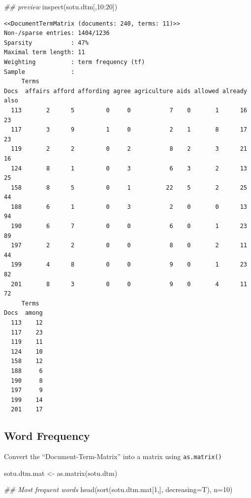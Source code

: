 \documentclass[
  letterpaper,
  DIV=11,
  numbers=noendperiod]{scrreprt}
\newenvironment{Shaded}{\begin{snugshade}}{\end{snugshade}}
\newcommand{\AttributeTok}[1]{\textcolor[rgb]{0.40,0.45,0.13}{#1}}
\newcommand{\DecValTok}[1]{\textcolor[rgb]{0.68,0.00,0.00}{#1}}
\newcommand{\DocumentationTok}[1]{\textcolor[rgb]{0.37,0.37,0.37}{\textit{#1}}}
\newcommand{\FunctionTok}[1]{\textcolor[rgb]{0.28,0.35,0.67}{#1}}
\newcommand{\NormalTok}[1]{\textcolor[rgb]{0.00,0.23,0.31}{#1}}
\newcommand{\OtherTok}[1]{\textcolor[rgb]{0.00,0.23,0.31}{#1}}
\newcommand{\SpecialCharTok}[1]{\textcolor[rgb]{0.37,0.37,0.37}{#1}}
\begin{document}
\begin{Shaded}
\begin{Highlighting}[]
\DocumentationTok{\#\# preview}
\FunctionTok{inspect}\NormalTok{(sotu.dtm[,}\DecValTok{10}\SpecialCharTok{:}\DecValTok{20}\NormalTok{])}
\end{Highlighting}
\end{Shaded}

\begin{verbatim}
<<DocumentTermMatrix (documents: 240, terms: 11)>>
Non-/sparse entries: 1404/1236
Sparsity           : 47%
Maximal term length: 11
Weighting          : term frequency (tf)
Sample             :
     Terms
Docs  affairs afford affording agree agriculture aids allowed already also
  113       2      5         0     0           7    0       1      16   23
  117       3      9         1     0           2    1       8      17   23
  119       2      2         0     2           8    2       3      21   16
  124       8      1         0     3           6    3       2      13   25
  158       8      5         0     1          22    5       2      25   44
  188       6      1         0     3           2    0       0      13   94
  190       6      7         0     0           6    0       1      23   89
  197       2      2         0     0           8    0       2      11   44
  199       4      8         0     0           9    0       1      23   82
  201       8      3         0     0           9    0       4      11   72
     Terms
Docs  among
  113    12
  117    23
  119    11
  124    10
  158    12
  188     6
  190     8
  197     9
  199    14
  201    17
\end{verbatim}

\hypertarget{word-frequency}{%
\subsection{Word Frequency}\label{word-frequency}}

Convert the ``Document-Term-Matrix'' into a matrix using
\texttt{as.matrix()}

\begin{Shaded}
\begin{Highlighting}[]
\NormalTok{sotu.dtm.mat }\OtherTok{\textless{}{-}} \FunctionTok{as.matrix}\NormalTok{(sotu.dtm)}

\DocumentationTok{\#\# Most frequent words}
\FunctionTok{head}\NormalTok{(}\FunctionTok{sort}\NormalTok{(sotu.dtm.mat[}\DecValTok{1}\NormalTok{,], }\AttributeTok{decreasing=}\NormalTok{T), }\AttributeTok{n=}\DecValTok{10}\NormalTok{)}
\end{Highlighting}
\end{Shaded}
\end{document}
